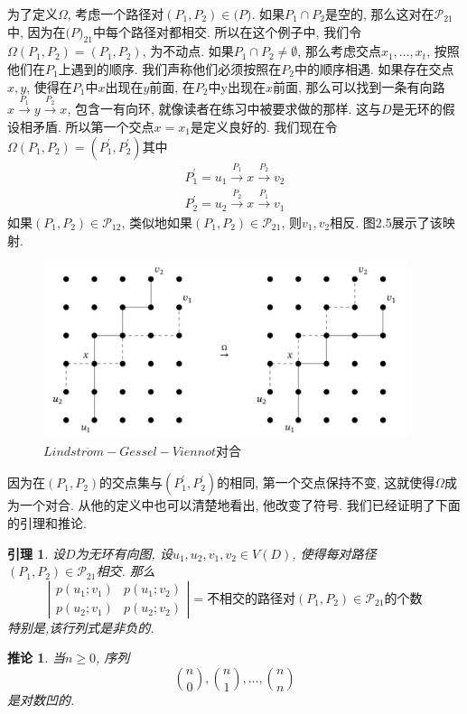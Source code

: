 \documentclass{ctexbook}
\newtheorem{lem}[thm]{引理}
\newtheorem{cor}[thm]{推论}
\begin{document}
	为了定义$\Omega$, 考虑一个路径对$(P_{1},P_{2})\in \mathcal(P)$. 如果$P_{1}\cap P_{2}$是空的, 那么这对在$\mathcal{P}_{21}$中, 因为在$\mathcal(P)_{21}$中每个路径对都相交. 所以在这个例子中, 我们令$\Omega(P_{1},P_{2})=(P_{1},P_{2})$, 为不动点. 如果$P_{1}\cap P_{2}\not=\emptyset$, 那么考虑交点$x_{1},\ldots,x_{t}$, 按照他们在$P_{1}$上遇到的顺序. 我们声称他们必须按照在$P_{2}$中的顺序相遇. 如果存在交点$x,y$, 使得在$P_{1}$中$x$出现在$y$前面, 在$P_{2}$中y出现在$x$前面, 那么可以找到一条有向路$x\stackrel{P_{1}}{\rightarrow} y\stackrel{P_{2}}{\rightarrow} x$, 包含一有向环, 就像读者在练习中被要求做的那样. 这与$D$是无环的假设相矛盾. 所以第一个交点$x=x_{1}$是定义良好的. 我们现在令$\Omega(P_{1},P_{2})=(P_{1}^{'},P_{2}^{'})$其中
\[
\begin{aligned}
	P_{1}^{'}=u_{1}\stackrel{P_{1}}{\rightarrow} x\stackrel{P_{2}}{\rightarrow} v_{2}\\
	P_{2}^{'}=u_{2}\stackrel{P_{2}}{\rightarrow} x\stackrel{P_{1}}{\rightarrow} v_{1}
\end{aligned}
\]
	如果$(P_{1},P_{2})\in \mathcal{P}_{12}$, 类似地如果$(P_{1},P_{2})\in \mathcal{P}_{21}$, 则$v_{1},v_{2}$相反. 图2.5展示了该映射.
\begin{figure}[htbp]
	\centering
	\includegraphics*[width=0.95\textwidth]{./fig2/5.jpg}
	\caption{$Lindstr\ddot{o}m-Gessel-Viennot$对合}
\end{figure}

	因为在$(P_{1},P_{2})$的交点集与$(P_{1}^{'},P_{2}^{'})$的相同, 第一个交点保持不变, 这就使得$\Omega$成为一个对合. 从他的定义中也可以清楚地看出, 他改变了符号. 我们已经证明了下面的引理和推论.
\begin{lem}
	设$D$为无环有向图, 设$u_{1},u_{2},v_{1},v_{2}\in V(D)$, 使得每对路径$(P_{1},P_{2})\in \mathcal{P}_{21}$相交. 那么
	\[
	\left|\begin{array}{cc} p(u_{1};v_{1}) & p(u_{1};v_{2}) \\
	p(u_{2};v_{1}) & p(u_{2};v_{2})
	\end{array}\right|=\text{不相交的路径对}(P_{1},P_{2})\in \mathcal{P}_{21}\text{的个数}
	\]
	特别是,该行列式是非负的.
\end{lem}
\begin{cor}
	当$n\geq 0$, 序列
	\[
	\binom{n}{0},\binom{n}{1},\ldots,\binom{n}{n}
	\]
	是对数凹的.
\end{cor}
\end{document}

